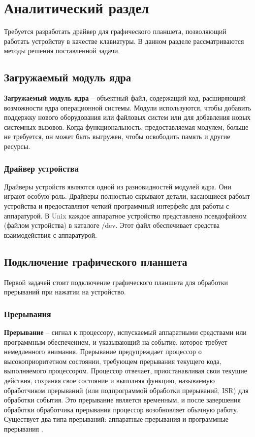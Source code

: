 \chapter{Аналитический раздел}
\label{cha:analysis}

Требуется разработать драйвер для графического планшета, позволяющий работать устройству в качестве клавиатуры. В данном разделе рассматриваются методы решения поставленной задачи.

\section{Загружаемый модуль ядра}

\textbf{Загружаемый модуль ядра} -- объектный файл, содержащий код, расширяющий возможности ядра операционной системы. Модули используются, чтобы добавить поддержку нового оборудования или файловых систем или для добавления новых системных вызовов. Когда функциональность, предоставляемая модулем, больше не требуется, он может быть выгружен, чтобы освободить память и другие ресурсы.

\subsection{Драйвер устройства}

Драйверы устройств являются одной из разновидностей модулей ядра. Они играют особую роль. Драйверы полностью скрывают детали, касающиеся рабоыт устройства и предоставляют четкий программный интерфейс для работы с аппаратурой. В Unix каждое аппаратное устройство представлено псевдофайлом (файлом устройства) в каталоге /dev. Этот файл обеспечивает средства взаимодействия с аппаратурой.

\section{Подключение графического планшета}

Первой задачей стоит подключение графического планшета для обработки прерываний при нажатии на устройство.

\subsection{Прерывания}

\textbf{Прерывание} -- сигнал к процессору, испускаемый аппаратными средствами или программным обеспечением, и указывающий на событие, которое требует немедленного внимания. Прерывание предупреждает процессор о высокоприоритетном состоянии, требующем прерывания текущего кода, выполняемого процессором. Процессор отвечает, приостанавливая свои текущие действия, сохраняя свое состояние и выполняя функцию, называемую обработчиком прерываний (или подпрограммой обработки прерываний, ISR) для обработки события. Это прерывание является временным, и после завершения обработки обработчика прерывания процессор возобновляет обычную работу. Существует два типа прерываний: аппаратные прерывания и программные прерывания \cite{Interrupts}.

